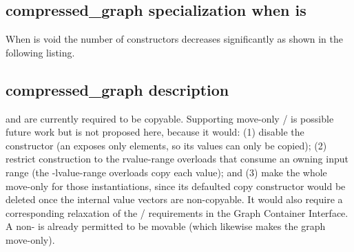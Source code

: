 \subsection{compressed\_graph specialization when  is } \label{compressed_specialization}
When  is void the number of constructors decreases significantly as shown in the following listing.

{\small
      
}

\subsection{compressed\_graph description}

 and  are currently required to be copyable. Supporting move-only /
is possible future work but is not proposed here, because it would: (1) disable the
 constructor (an  exposes only  elements, so its
values can only be copied); (2) restrict construction to the rvalue-range overloads that consume an owning
input range (the -lvalue-range overloads copy each value); and (3) make the whole
 move-only for those instantiations, since its defaulted copy constructor would be
deleted once the internal value vectors are non-copyable. It would also require a corresponding relaxation of
the / requirements in the Graph Container Interface. A non-
 is already permitted to be movable (which likewise makes the graph move-only).

